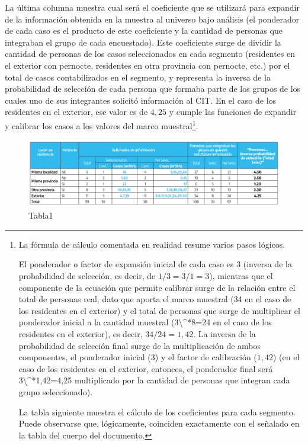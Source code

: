\documentclass[
]{book}
\begin{document}
La última columna muestra cual será el coeficiente que se utilizará para expandir de la información obtenida en la muestra al universo bajo análisis (el ponderador de cada caso es el producto de este coeficiente y la cantidad de personas que integraban el grupo de cada encuestado). Este coeficiente surge de dividir la cantidad de personas de los casos seleccionados en cada segmento (residentes en el exterior con pernocte, residentes en otra provincia con pernocte, etc.) por el total de casos contabilizados en el segmento, y representa la inversa de la probabilidad de selección de cada persona que formaba parte de los grupos de los cuales uno de sus integrantes solicitó información al CIT. En el caso de los residentes en el exterior, ese valor es de \(4,25\) y cumple las funciones de expandir y calibrar los casos a los valores del marco muestral\footnote{La fórmula de cálculo comentada en realidad resume varios pasos lógicos.

  El ponderador o factor de expansión inicial de cada caso es 3 (inversa de la probabilidad de selección, es decir, de \(1/3=3/1=3\)), mientras que el componente de la ecuación que permite calibrar surge de la relación entre el total de personas real, dato que aporta el marco muestral (34 en el caso de los residentes en el exterior) y el total de personas que surge de multiplicar el ponderador inicial a la cantidad muestral (3\textbackslash\^{}*8=24 en el caso de los residentes en el exterior), es decir, \(34/24=1,42\). La inversa de la probabilidad de selección final surge de la multiplicación de ambos componentes, el ponderador inicial (\(3\)) y el factor de calibración (\(1,42\)) (en el caso de los residentes en el exterior, entonces, el ponderador final será 3\textbackslash\^{}*1,42=4,25 multiplicado por la cantidad de personas que integran cada grupo seleccionado).

  La tabla siguiente muestra el cálculo de los coeficientes para cada segmento. Puede observarse que, lógicamente, coinciden exactamente con el señalado en la tabla del cuerpo del documento.}.

\begin{figure}
\includegraphics[width=1\linewidth]{imagenes/tabla_1} \caption{Tabla1}\label{fig:Coeficientes}
\end{figure}
\end{document}

